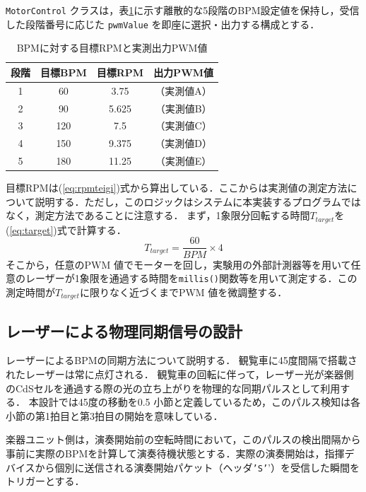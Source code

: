 \documentclass[lualatex,book,paper=a4paper,jafontsize=11.5pt,jafontscale=1.05]{jlreq}
\begin{document}
\texttt{MotorControl} クラスは，表\ref{tab:pwm_lut}に示す離散的な5段階のBPM設定値を保持し，受信した段階番号に応じた \texttt{pwmValue} を即座に選択・出力する構成とする．
\begin{table}[H]
\centering
\caption{BPMに対する目標RPMと実測出力PWM値}
\label{tab:pwm_lut}
\begin{tabular}{c|c|c|c}
\hline
段階 & 目標BPM & 目標RPM & 出力PWM値 \\ \hline
1 & 60 & 3.75 &（実測値A）\\
2 & 90 & 5.625 &（実測値B）\\
3 & 120 & 7.5 &（実測値C）\\
4 & 150 & 9.375 &（実測値D）\\
5 & 180 & 11.25 &（実測値E）\\ \hline
\end{tabular}
\end{table}
目標RPMは(\ref{eq:rpmteigi})式から算出している．ここからは実測値の測定方法について説明する．ただし，このロジックはシステムに本実装するプログラムではなく，測定方法であることに注意する．
まず，1象限分回転する時間$T_{target}$を(\ref{eq:target})式で計算する．
\begin{equation}
\label{eq:target}
    T_{target} = \frac{60}{BPM} \times 4
\end{equation}
そこから，任意のPWM 値でモーターを回し，実験用の外部計測器等を用いて任意のレーザーが1象限を通過する時間を\texttt{millis()}関数等を用いて測定する．この測定時間が$T_{target}$に限りなく近づくまでPWM 値を微調整する．

\subsection{レーザーによる物理同期信号の設計}
レーザーによるBPMの同期方法について説明する．
観覧車に45度間隔で搭載されたレーザーは常に点灯される．
観覧車の回転に伴って，レーザー光が楽器側のCdSセルを通過する際の光の立ち上がりを物理的な同期パルスとして利用する．
本設計では45度の移動を0.5 小節と定義しているため，このパルス検知は各小節の第1拍目と第3拍目の開始を意味している．

楽器ユニット側は，演奏開始前の空転時間において，このパルスの検出間隔から事前に実際のBPMを計算して演奏待機状態とする．実際の演奏開始は，指揮デバイスから個別に送信される演奏開始パケット（ヘッダ\texttt{'S'}'）を受信した瞬間をトリガーとする．
\end{document}
